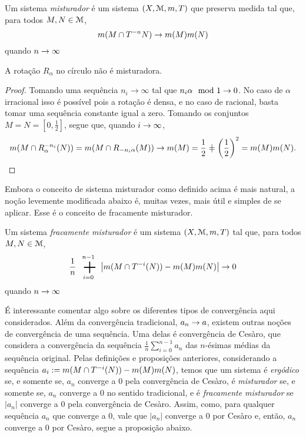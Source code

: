 \begin{definition}
	Um sistema \emph{misturador} é um sistema $(X,\mathcal{M},m,T)$ que preserva medida tal que, para todos $M,N \in \mathcal{M}$,
	\begin{equation*}
	m(M \cap T^{-n} N) \rightarrow m(M)m(N)
	\end{equation*}
quando $n \rightarrow \infty$
\end{definition}

\begin{proposition}
	A rotação $R_\alpha$ no círculo não é misturadora.
\end{proposition}
\begin{proof}
	Tomando uma sequência $n_i \to \infty$ tal que $n_i\alpha \mod 1 \rightarrow 0$. No caso de $\alpha$ irracional isso é possível pois a rotação é densa, e no caso de racional, basta tomar uma sequência constante igual a zero. Tomando os conjuntos $M=N=[0,\frac{1}{2}]$, segue que, quando $i \rightarrow \infty$,
	\begin{equation*}
	\med(M \cap R_\alpha^{-n_i}(N))=\med(M \cap R_{-n_i\alpha}(M)) \conv \med(M)=\frac{1}{2}\neq \left(\frac{1}{2}\right)^2=\med(M)\med(N).
	\end{equation*}
\end{proof}

	Embora o conceito de sistema misturador como definido acima é mais natural, a noção levemente modificada abaixo é, muitas vezes, mais útil e simples de se aplicar. Esse é o conceito de fracamente misturador.

\begin{definition}
	Um sistema \emph{fracamente misturador} é um sistema $(X,\mathcal{M},m,T)$ tal que, para todos $M,N \in \mathcal{M}$,
	\begin{equation*}
	\frac{1}{n} \sum_{i=0}^{n-1} \left|\med(M \cap T^{-i}(N)) - \med(M)\med(N)\right| \conv 0
	\end{equation*}
quando $n \rightarrow \infty$
\end{definition}

	É interessante comentar algo sobre os diferentes tipos de convergência aqui considerados. Além da convergência tradicional, $a_n \rightarrow a$, existem outras noções de convergência de uma sequência. Uma delas é convergência de Cesàro, que considera a convergência da sequência $\frac{1}{n} \sum_{i=0}^{n-1} a_n$ das $n$-ésimas médias da sequência original. Pelas definições e proposições anteriores, considerando a sequência $a_i := m(M \cap T^{-i}(N)) - m(M)m(N)$, temos que um sistema é \emph{ergódico} se, e somente se, $a_n$ converge a $0$ pela convergência de Cesàro, é \emph{misturador} se, e somente se, $a_n$ converge a $0$ no sentido tradicional, e é \emph{fracamente misturador} se $|a_n|$ converge a $0$ pela convergência de Cesàro. Assim, como, para qualquer sequência $a_n$ que converge a $0$, vale que $|a_n|$ converge a $0$ por Cesàro e, então, $a_n$ converge a $0$ por Cesàro, segue a proposição abaixo.

